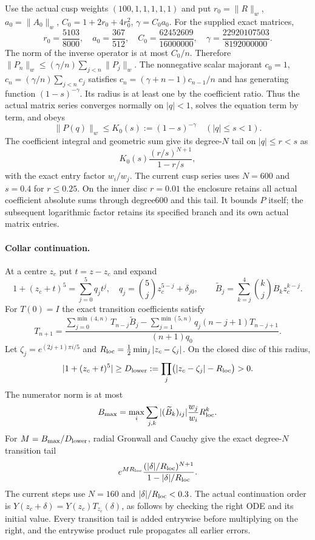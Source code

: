 Use the actual cusp weights $(100,1,1,1,1,1)$ and put
$r_0=\|R\|_w$, $a_0=\|A_0\|_w$,
$C_0=1+2r_0+4r_0^2$, $\gamma=C_0a_0$. For the supplied exact
matrices,
\[
 r_0=\frac{5103}{8000},\quad a_0=\frac{367}{512},\quad
 C_0=\frac{62452609}{16000000},\quad
 \gamma=\frac{22920107503}{8192000000}.
\]
The norm of the inverse operator is at most $C_0/n$. Therefore
$\|P_n\|_w\le(\gamma/n)\sum_{j<n}\|P_j\|_w$.
The nonnegative scalar majorant $c_0=1$,
$c_n=(\gamma/n)\sum_{j<n}c_j$ satisfies
$c_n=(\gamma+n-1)c_{n-1}/n$ and has generating function
$(1-s)^{-\gamma}$. Its radius is at least one by the coefficient
ratio. Thus the actual matrix series converges normally on
$|q|<1$, solves the equation term by term, and obeys
\[
 \|P(q)\|_w\le K_0(s):=(1-s)^{-\gamma}\quad(|q|\le s<1).
\]
The coefficient integral and geometric sum give its degree-$N$
tail on $|q|\le r<s$ as
\[
 K_0(s)\frac{(r/s)^{N+1}}{1-r/s},
\]
with the exact entry factor $w_i/w_j$. The current cusp series
uses $N=600$ and $s=0.4$ for $r\le0.25$. On the inner disc
$r=0.01$ the enclosure retains all actual coefficient absolute
sums through degree600 and this tail. It bounds $P$ itself;
the subsequent logarithmic factor retains its specified branch
and its own actual matrix entries.

\paragraph{Collar continuation.}
At a centre $z_c$ put $t=z-z_c$ and expand
\[
 1+(z_c+t)^5=\sum_{j=0}^5q_jt^j,
 \quad q_j=\binom5jz_c^{5-j}+\delta_{j0},
 \qquad
 \widetilde B_j=\sum_{k=j}^4\binom kjB_kz_c^{k-j}.
\]
For $T(0)=I$ the exact transition coefficients satisfy
\[
 T_{n+1}=
 \frac{\displaystyle
   \sum_{j=0}^{\min(4,n)}T_{n-j}\widetilde B_j
  -\sum_{j=1}^{\min(5,n)}q_j(n-j+1)T_{n-j+1}}
 {(n+1)q_0}.
\]
Let $\zeta_j=e^{(2j+1)\pi i/5}$ and
$R_{\rm loc}=\tfrac12\min_j|z_c-\zeta_j|$. On the closed disc
of this radius,
\[
 |1+(z_c+t)^5|\ge D_{\rm lower}
   :=\prod_j\bigl(|z_c-\zeta_j|-R_{\rm loc}\bigr)>0.
\]
The numerator norm is at most
\[
 B_{\max}=\max_i\sum_{j,k}|(\widetilde B_k)_{ij}|
                  \frac{w_j}{w_i}R_{\rm loc}^k.
\]
For $M=B_{\max}/D_{\rm lower}$, radial Gronwall and Cauchy
give the exact degree-$N$ transition tail
\[
 e^{MR_{\rm loc}}
 \frac{(|\delta|/R_{\rm loc})^{N+1}}
      {1-|\delta|/R_{\rm loc}}.
\]
The current steps use $N=160$ and
$|\delta|/R_{\rm loc}<0.3$. The actual continuation order is
$Y(z_c+\delta)=Y(z_c)T_{z_c}(\delta)$, as follows by checking
the right ODE and its initial value. Every transition tail is
added entrywise before multiplying on the right, and the
entrywise product rule propagates all earlier errors.

